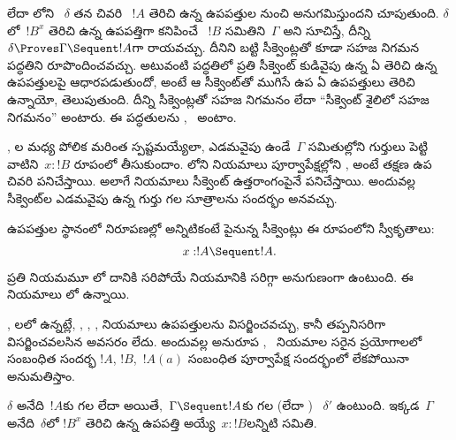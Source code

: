 \documentclass[../../../include/open-logic-section]{subfiles}
\begin{document}


 లేదా లోని ~$\delta$ తన చివరి ~$!A$ తెరిచి ఉన్న ఉపపత్తుల నుంచి అనుగమిస్తుందని చూపుతుంది. $\delta$లో~$!B^x$ తెరిచి ఉన్న ఉపపత్తిగా కనిపించే ~$!B$ సమితిని~$\Gamma$ అని సూచిస్తే, దీన్ని $\delta \Proves \Gamma
\Sequent !A$గా రాయవచ్చు. దీనిని బట్టి సీక్వెంట్లతో కూడా సహజ నిగమన పద్ధతిని రూపొందించవచ్చు. అటువంటి పద్ధతిలో ప్రతి సీక్వెంట్ కుడివైపు ఉన్న  ఏ తెరిచి ఉన్న ఉపపత్తులపై ఆధారపడుతుందో, అంటే ఆ సీక్వెంట్‌తో ముగిసే ఉప ఏ ఉపపత్తులు తెరిచి ఉన్నాయో, తెలుపుతుంది. దీన్ని సీక్వెంట్లతో సహజ నిగమనం లేదా ``సీక్వెంట్ శైలిలో సహజ నిగమనం'' అంటారు. ఈ పద్ధతులను ,~ అంటాం.

, ల మధ్య పోలిక మరింత స్పష్టమయ్యేలా, ఎడమవైపు ఉండే~$\Gamma$ సమితుల్లోని  గుర్తులు పెట్టి వాటిని~$x:!B$ రూపంలో తీసుకుందాం. లోని నియమాలు పూర్వాపేక్షల్లోని , అంటే తక్షణ ఉప చివరి  పనిచేస్తాయి. అలాగే  నియమాలు సీక్వెంట్ ఉత్తరాంగంపైనే పనిచేస్తాయి. అందువల్ల సీక్వెంట్‌ల ఎడమవైపు ఉన్న గుర్తు గల సూత్రాలను సందర్భం అనవచ్చు.

ఉపపత్తుల స్థానంలో  నిరూపణల్లో అన్నిటికంటే పైనున్న సీక్వెంట్లు ఈ రూపంలోని స్వీకృతాలు:
\[x:!A \Sequent !A.\]
ప్రతి నియమమూ లో దానికి సరిపోయే నియమానికి సరిగ్గా అనుగుణంగా ఉంటుంది. ఈ నియమాలు లో ఉన్నాయి.



, లలో ఉన్నట్లే, \Intro{\lif}, \Intro{\lnot}, \Elim{\lor}, \Elim{\lexists} నియమాలు ఉపపత్తులను విసర్జించవచ్చు, కానీ తప్పనిసరిగా విసర్జించవలసిన అవసరం లేదు. అందువల్ల అనురూప ,~ నియమాల సరైన ప్రయోగాలలో సంబంధిత సందర్భ  $!A$, $!B$,~$!A(a)$ సంబంధిత పూర్వాపేక్ష సందర్భంలో లేకపోయినా అనుమతిస్తాం.

\begin{prop}
$\delta$ అనేది~$!A$కు గల  లేదా   అయితే,~$\Gamma \Sequent !A$కు గల  (లేదా ) ~$\delta'$ ఉంటుంది. ఇక్కడ~$\Gamma$ అనేది~$\delta$లో $!B^x$ తెరిచి ఉన్న ఉపపత్తి అయ్యే~$x:!B$లన్నిటి సమితి.
\end{prop}
\end{document}
